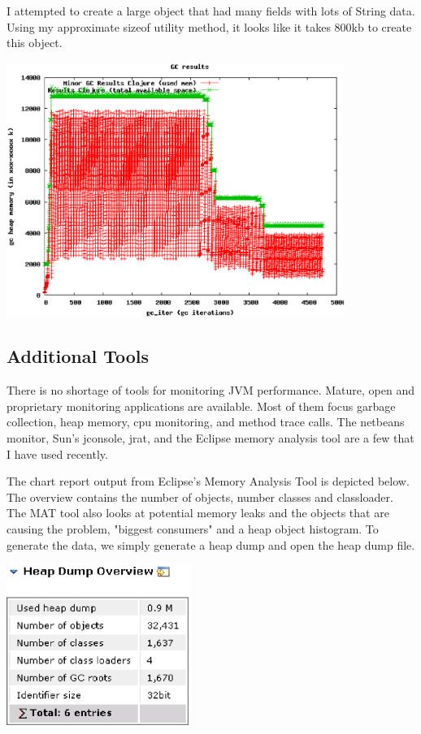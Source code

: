 I attempted to create a large object that had many fields with lots of String data. Using my approximate sizeof utility method, it looks like it takes 800kb to create this object.

\includegraphics[width=110mm]{gc_5_vars_clj_25.eps}

\subsection{Additional Tools}

There is no shortage of tools for monitoring JVM performance. Mature, open and proprietary monitoring applications are available. Most of them focus garbage collection, heap memory, cpu monitoring, and method trace calls. The netbeans monitor, Sun's jconsole, jrat, and the Eclipse memory analysis tool are a few that I have used recently.

The chart report output from Eclipse's Memory Analysis Tool is depicted below. The overview contains the number of objects, number classes and classloader. The MAT tool also looks at potential memory leaks and the objects that are causing the problem, "biggest consumers" and a heap object histogram. To generate the data, we simply generate a heap dump and open the heap dump file.

\includegraphics[width=60mm]{hist_clj_30.eps}


